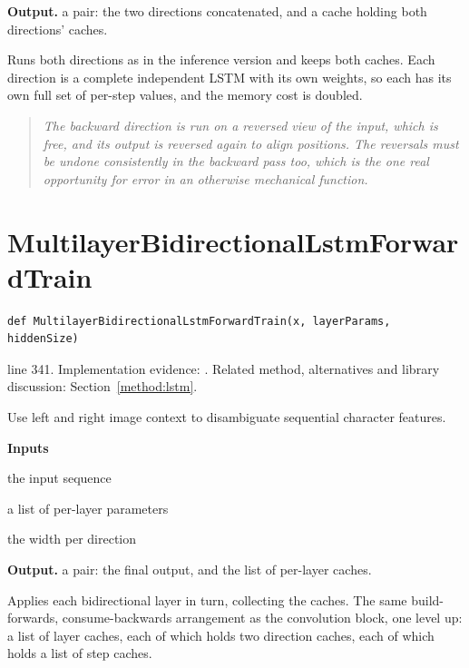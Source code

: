 \noindent\textbf{Output.} a pair: the two directions concatenated, and a cache holding both directions' caches.


Runs both directions as in the inference version and keeps both caches. Each direction is a complete independent LSTM with its own weights, so each has its own full set of per-step values, and the memory cost is doubled.


\begin{quote}\small\itshape The backward direction is run on a reversed view of the input, which is free, and its output is reversed again to align positions. The reversals must be undone consistently in the backward pass too, which is the one real opportunity for error in an otherwise mechanical function.\end{quote}


\section{MultilayerBidirectionalLstmForwardTrain}\label{fn:train:MultilayerBidirectionalLstmForwardTrain}
\begin{lstlisting}[style=sig]
def MultilayerBidirectionalLstmForwardTrain(x, layerParams, hiddenSize)
\end{lstlisting}
 line 341. Implementation evidence: \cite{code2026}. Related method, alternatives and library discussion: Section~\ref{method:lstm}.


Use left and right image context to disambiguate sequential character features.




\noindent\textbf{Inputs}
\begin{description}[leftmargin=2.2em,style=nextline,font=\normalfont\ttfamily]\setlength\itemsep{1pt}
  \item[{x}] \normalfont the input sequence
  \item[{layerParams}] \normalfont a list of per-layer parameters
  \item[{hiddenSize}] \normalfont the width per direction
\end{description}

\noindent\textbf{Output.} a pair: the final output, and the list of per-layer caches.


Applies each bidirectional layer in turn, collecting the caches. The same build-forwards, consume-backwards arrangement as the convolution block, one level up: a list of layer caches, each of which holds two direction caches, each of which holds a list of step caches.




